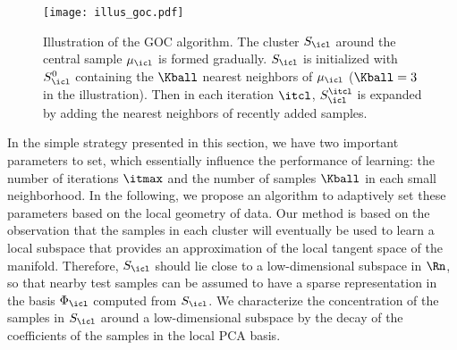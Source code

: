 \documentclass[journal]{IEEEtran}
\begin{document}



\begin{figure}[!t]
	\centering
	\texttt{[image: illus\_goc.pdf]}
	\caption{Illustration of the GOC algorithm. The cluster $S_\icl$  around the central sample $\mu_\icl$ is formed gradually. $S_\icl$ is initialized with $S_\icl^0$ containing the $\Kball$ nearest neighbors of $\mu_\icl$ ($\Kball=3$ in the illustration). Then in each iteration $\itcl$, $S_\icl^{\itcl}$ is expanded by adding the nearest neighbors of recently added samples.}
	\label{fig:illus_goc}
\end{figure}

In the simple strategy presented in this section, we have two important parameters to set, which essentially influence the performance of learning: the number of iterations $\itmax$ and the number of samples $\Kball$ in each small neighborhood. In the following, we propose an algorithm to adaptively set these parameters based on the local geometry of data. Our method is based on the observation that the samples in each cluster will eventually be used to learn a local subspace that provides an approximation of the local tangent space of the manifold. Therefore,  $S_\icl$ should lie close to a low-dimensional subspace in $\Rn$, so that nearby test samples  can be assumed to have a sparse representation in the basis $\Phi_\icl$ computed from $S_\icl$. We characterize the concentration of the samples in $S_\icl$ around  a low-dimensional subspace by the decay of the coefficients of the samples in the local PCA basis. 

 
\end{document}
